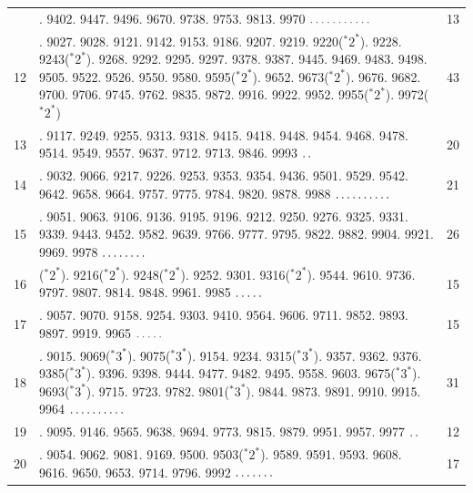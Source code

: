 \par\medskip
\begingroup\small
\setlength{\tabcolsep}{4pt}
\begin{longtable}{@{}r>{\raggedright\arraybackslash}p{}r@{}}
 & 9322. 9402. 9447. 9496. 9670. 9738. 9753. 9813. 9970 \(\mathinner{.\,.\,.\,.\,.\,.\,.\,.\,.\,.\,.}\) & 13\\
12 & 9018. 9027. 9028. 9121. 9142. 9153. 9186. 9207. 9219. 9220(${}^{*}2^{*}$). 9228. 9243(${}^{*}2^{*}$). 9268. 9292. 9295. 9297. 9378. 9387. 9445. 9469. 9483. 9498. 9505. 9522. 9526. 9550. 9580. 9595(${}^{*}2^{*}$). 9652. 9673(${}^{*}2^{*}$). 9676. 9682. 9700. 9706. 9745. 9762. 9835. 9872. 9916. 9922. 9952. 9955(${}^{*}2^{*}$). 9972(${}^{*}2^{*}$) & 43\\
13 & 9082. 9117. 9249. 9255. 9313. 9318. 9415. 9418. 9448. 9454. 9468. 9478. 9514. 9549. 9557. 9637. 9712. 9713. 9846. 9993 \(\mathinner{.\,.}\) & 20\\
14 & 9017. 9032. 9066. 9217. 9226. 9253. 9353. 9354. 9436. 9501. 9529. 9542. 9642. 9658. 9664. 9757. 9775. 9784. 9820. 9878. 9988 \(\mathinner{.\,.\,.\,.\,.\,.\,.\,.\,.\,.}\) & 21\\
15 & 9033. 9051. 9063. 9106. 9136. 9195. 9196. 9212. 9250. 9276. 9325. 9331. 9339. 9443. 9452. 9582. 9639. 9766. 9777. 9795. 9822. 9882. 9904. 9921. 9969. 9978 \(\mathinner{.\,.\,.\,.\,.\,.\,.\,.}\) & 26\\
16 & 9214(${}^{*}2^{*}$). 9216(${}^{*}2^{*}$). 9248(${}^{*}2^{*}$). 9252. 9301. 9316(${}^{*}2^{*}$). 9544. 9610. 9736. 9797. 9807. 9814. 9848. 9961. 9985 \(\mathinner{.\,.\,.\,.\,.}\) & 15\\
17 & 9002. 9057. 9070. 9158. 9254. 9303. 9410. 9564. 9606. 9711. 9852. 9893. 9897. 9919. 9965 \(\mathinner{.\,.\,.\,.\,.}\) & 15\\
18 & 9012. 9015. 9069(${}^{*}3^{*}$). 9075(${}^{*}3^{*}$). 9154. 9234. 9315(${}^{*}3^{*}$). 9357. 9362. 9376. 9385(${}^{*}3^{*}$). 9396. 9398. 9444. 9477. 9482. 9495. 9558. 9603. 9675(${}^{*}3^{*}$). 9693(${}^{*}3^{*}$). 9715. 9723. 9782. 9801(${}^{*}3^{*}$). 9844. 9873. 9891. 9910. 9915. 9964 \(\mathinner{.\,.\,.\,.\,.\,.\,.\,.\,.\,.}\) & 31\\
19 & 9053. 9095. 9146. 9565. 9638. 9694. 9773. 9815. 9879. 9951. 9957. 9977 \(\mathinner{.\,.}\) & 12\\
20 & 9039. 9054. 9062. 9081. 9169. 9500. 9503(${}^{*}2^{*}$). 9589. 9591. 9593. 9608. 9616. 9650. 9653. 9714. 9796. 9992 \(\mathinner{.\,.\,.\,.\,.\,.\,.}\) & 17\\

\end{longtable}
